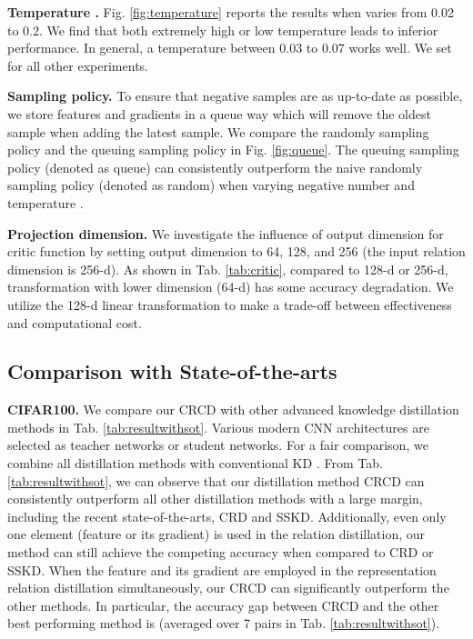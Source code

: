 \documentclass[final]{cvpr}
\begin{document}
\noindent \textbf{Temperature .} Fig. \ref{fig:temperature} 
reports the results when  varies from 0.02 to 0.2. We find that both extremely high or low temperature leads to inferior performance.
In general, a temperature  between 0.03 to 0.07  works well. We set  for all other 
experiments.



\noindent \textbf{Sampling policy.}
To ensure that negative samples are as up-to-date as possible,  we store features and gradients in a queue way which will remove the oldest sample when adding the latest sample. 
We compare the randomly sampling policy and the queuing sampling policy in Fig. \ref{fig:queue}. The queuing sampling policy (denoted as queue) can consistently outperform the naive randomly sampling policy (denoted as random) when varying negative number  and temperature .


\noindent \textbf{Projection dimension.} 
We investigate the influence of output dimension for critic function   by setting output dimension to 64, 128, and 256 (the input relation dimension is  256-d).
As shown in Tab. \ref{tab:critic},
compared to 128-d or 256-d,  transformation with  lower dimension (64-d)  has some accuracy degradation. We utilize the 128-d linear transformation to make a trade-off between effectiveness and computational cost. 


\subsection{Comparison with State-of-the-arts}

\noindent \textbf{CIFAR100.} 
We compare our CRCD with other advanced knowledge distillation methods in Tab. \ref{tab:resultwithsot}.
Various modern CNN architectures \cite{resnet,mobilenets,shufflenet,wideresnet}
are selected as teacher networks or student networks.
For a fair comparison, we combine all distillation methods with conventional KD \cite{hinton2015distilling}. From Tab. \ref{tab:resultwithsot}, we can observe that our distillation method CRCD can consistently outperform all other distillation methods with a large margin, including the recent state-of-the-arts, CRD and SSKD.
Additionally, even only one element (feature or its gradient)
is used in the relation distillation, our method can still achieve the competing accuracy when compared to CRD or SSKD. When the feature and its gradient are employed in the representation relation distillation simultaneously, our CRCD can significantly outperform the other methods. In particular, the accuracy gap between CRCD and the other best performing method is  (averaged over 7 
pairs in Tab. \ref{tab:resultwithsot}).
\end{document}
